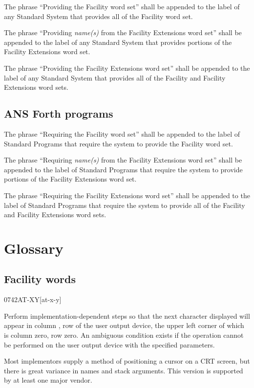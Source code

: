 The phrase ``Providing the Facility word set'' shall be appended to
the label of any Standard System that provides all of the Facility
word set.

The phrase ``Providing \emph{name(s)} from the Facility Extensions
word set'' shall be appended to the label of any Standard System
that provides portions of the Facility Extensions word set.

The phrase ``Providing the Facility Extensions word set'' shall be
appended to the label of any Standard System that provides all of
the Facility and Facility Extensions word sets.

\subsection{ANS Forth programs} %

The phrase ``Requiring the Facility word set'' shall be appended to
the label of Standard Programs that require the system to provide
the Facility word set.

The phrase ``Requiring \emph{name(s)} from the Facility Extensions
word set'' shall be appended to the label of Standard Programs that
require the system to provide portions of the Facility Extensions
word set.

The phrase ``Requiring the Facility Extensions word set'' shall be
appended to the label of Standard Programs that require the system
to provide all of the Facility and Facility Extensions word sets.

\section{Glossary} %

\subsection{Facility words} %

\begin{worddef}{0742}{AT-XY}[at-x-y]
\item {}

	Perform implementation-dependent steps so that the next
	character displayed will appear in column , row
	 of the user output device, the upper left corner
	of which is column zero, row zero. An ambiguous condition exists
	if the operation cannot be performed on the user output device
	with the specified parameters.

	\begin{rationale} %
		Most implementors supply a method of positioning a cursor on
		a CRT screen, but there is great variance in names and stack
		arguments. This version is supported by at least one major
		vendor.
	\end{rationale}
\end{worddef}


